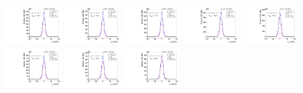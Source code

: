 \begin{figure}[htb]
\includegraphics[width=0.19\textwidth]{plots/Appendix_Recoil_Fits/WmmMC_PF_13TeV_2G/pfu2fit_16.pdf}
\includegraphics[width=0.19\textwidth]{plots/Appendix_Recoil_Fits/WmmMC_PF_13TeV_2G/pfu2fit_17.pdf}
\includegraphics[width=0.19\textwidth]{plots/Appendix_Recoil_Fits/WmmMC_PF_13TeV_2G/pfu2fit_18.pdf}
\includegraphics[width=0.19\textwidth]{plots/Appendix_Recoil_Fits/WmmMC_PF_13TeV_2G/pfu2fit_19.pdf}
\includegraphics[width=0.19\textwidth]{plots/Appendix_Recoil_Fits/WmmMC_PF_13TeV_2G/pfu2fit_20.pdf}
\includegraphics[width=0.19\textwidth]{plots/Appendix_Recoil_Fits/WmmMC_PF_13TeV_2G/pfu2fit_21.pdf}
\includegraphics[width=0.19\textwidth]{plots/Appendix_Recoil_Fits/WmmMC_PF_13TeV_2G/pfu2fit_22.pdf}
\includegraphics[width=0.19\textwidth]{plots/Appendix_Recoil_Fits/WmmMC_PF_13TeV_2G/pfu2fit_23.pdf}

\end{figure}
